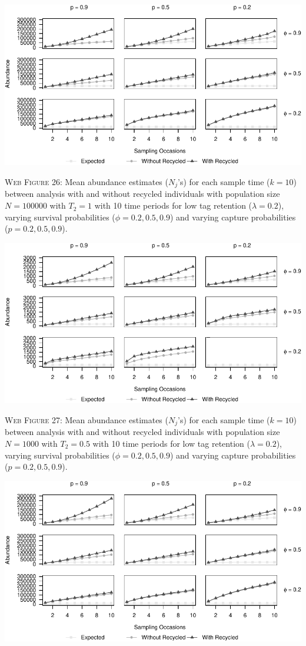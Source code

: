 \documentclass[]{article}
\begin{document}
\includegraphics{Appendix_BW_files/figure-latex/26_abundance_L_GJSTL2-1.pdf}

\textsc{Web Figure 26:} Mean abundance estimates (\(N_j\)'s) for each
sample time (\(k=10\)) between analysis with and without recycled
individuals with population size \(N=100000\) with \(T_2=1\) with 10
time periods for low tag retention (\(\lambda=0.2\)), varying survival
probabilities (\(\phi=0.2,0.5,0.9\)) and varying capture probabilities
(\(p=0.2,0.5,0.9\)).

\newpage

\includegraphics{Appendix_BW_files/figure-latex/27_abundance_L_GJSTL4-1.pdf}

\textsc{Web Figure 27:} Mean abundance estimates (\(N_j\)'s) for each
sample time (\(k=10\)) between analysis with and without recycled
individuals with population size \(N=1000\) with \(T_2=0.5\) with 10
time periods for low tag retention (\(\lambda=0.2\)), varying survival
probabilities (\(\phi=0.2,0.5,0.9\)) and varying capture probabilities
(\(p=0.2,0.5,0.9\)).

\includegraphics{Appendix_BW_files/figure-latex/28_abundance_L_GJSTL3-1.pdf}
\end{document}
